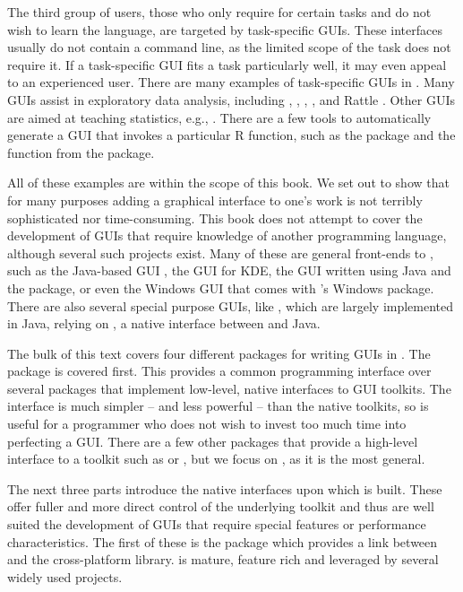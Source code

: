 The third group of users, those who only require  for
certain tasks and do not wish to learn the language, are targeted by
task-specific GUIs. These interfaces usually do not contain a command
line, as the limited scope of the task does not require it. If a
task-specific GUI fits a task particularly well, it may even appeal to
an experienced user. There are many examples of task-specific GUIs in
. Many GUIs assist in exploratory data analysis, including
 \citep{explorase},  \citep{limma},
, , and Rattle \citep{rattle}.  Other
GUIs are aimed at teaching statistics, e.g.,
. There are a few tools to automatically generate a
GUI that invokes a particular R function, such as the 
package and the  function from the
 package.

All of these examples are within the scope of this book. We set out to
show that for many purposes adding a graphical interface to one's work
is not terribly sophisticated nor time-consuming.  This book does not
attempt to cover the development of GUIs that require knowledge of
another programming language, although several such projects
exist. Many of these are general front-ends to \R\/, such as the
Java-based GUI , the  GUI for KDE, the
 GUI written using Java and the  package, or
even the Windows GUI that comes with \R's Windows package. There are
also several special purpose GUIs, like , which are
largely implemented in Java, relying on , a native
interface between \R\/ and Java.

The bulk of this text covers four different packages for writing GUIs
in \R. The  package is covered first. This provides a
common programming interface over several \R\/ packages that implement
low-level, native interfaces to GUI toolkits. The 
interface is much simpler -- and less powerful -- than the native
toolkits, so is useful for a programmer who does not wish to invest
too much time into perfecting a GUI. There are a few other packages
that provide a high-level \R\/ interface to a toolkit such as
 or , but we focus on , as
it is the most general.


The next three parts introduce the native interfaces upon which
 is built. These offer fuller and more direct control of
the underlying toolkit and thus are well suited the development of GUIs
that require special features or performance characteristics.  The
first of these is the  package which provides a link
between \R\/ and the cross-platform \GTK\/ library. \GTK\/ is mature,
feature rich and leveraged by several widely used
projects. 

